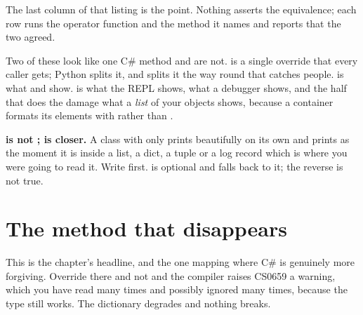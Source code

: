 

\noindent
The last column of that listing is the point. Nothing asserts the
equivalence; each row runs the operator function and the method it names
and reports that the two agreed.

Two of these look like one C\# method and are not.  is a
single override that every caller gets; Python splits it, and splits it the
way round that catches people.  is what  and
 show.  is what the REPL shows, what a
debugger shows, and \dash{} the half that does the damage \dash{} what a
\emph{list} of your objects shows, because a container formats its elements
with  rather than .



\begin{trapbox}
\textbf{ is not ;  is
closer.} A class with only  prints beautifully on its own
and prints as  the moment it is inside
a list, a dict, a tuple or a log record \dash{} which is where you were
going to read it. Write  first.  is
optional and falls back to it; the reverse is not true.
\end{trapbox}

\section{The method that disappears}
\label{sec:ch04-equality}

This is the chapter's headline, and the one mapping where C\# is genuinely
more forgiving. Override  there and not  and
the compiler raises CS0659 \dash{} a warning, which you have read many
times and possibly ignored many times, because the type still works. The
dictionary degrades and nothing breaks.

